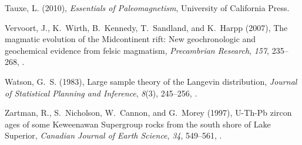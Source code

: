 \documentclass[draft,gc]{AGUTeX}
\begin{document}
\begin{article}
\begin{thebibliography}{24}
{Tauxe}, L. (2010), \textit{Essentials of Paleomagnetism}, University of
  California Press.

Vervoort, J., K.~Wirth, B.~Kennedy, T.~Sandland, and K.~Harpp (2007), The
  magmatic evolution of the {M}idcontinent rift: New geochronologic and
  geochemical evidence from felsic magmatism, \textit{Precambrian Research},
  \textit{157}, 235--268, .

Watson, G.~S. (1983), Large sample theory of the Langevin distribution,
  \textit{Journal of Statistical Planning and Inference}, \textit{8}(3),
  245--256, .

Zartman, R., S.~Nicholson, W.~Cannon, and G.~Morey (1997), {U-Th-Pb} zircon
  ages of some {K}eweenawan {S}upergroup rocks from the south shore of {L}ake
  {S}uperior, \textit{Canadian Journal of Earth Science}, \textit{34},
  549--561, .

\end{thebibliography}




%

%
%
\end{article}
%
%
%
%
%
%
\end{document}

